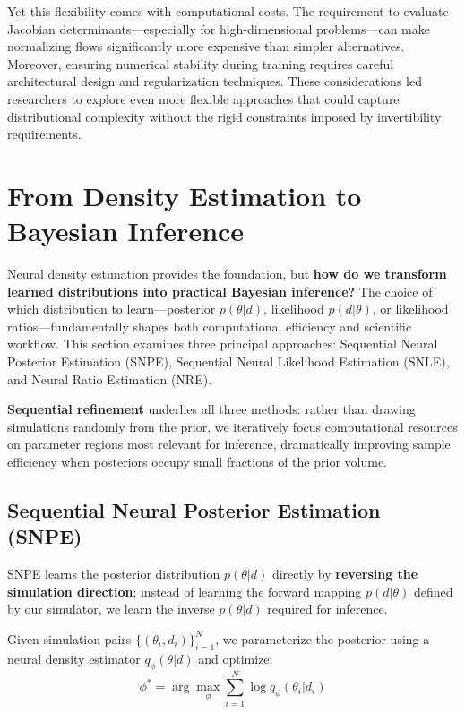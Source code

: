 \documentclass{SciPost}
\begin{document}
Yet this flexibility comes with computational costs. The requirement to evaluate Jacobian determinants—especially for high-dimensional problems—can make normalizing flows significantly more expensive than simpler alternatives. Moreover, ensuring numerical stability during training requires careful architectural design and regularization techniques. These considerations led researchers to explore even more flexible approaches that could capture distributional complexity without the rigid constraints imposed by invertibility requirements.


\section{From Density Estimation to Bayesian Inference}

Neural density estimation provides the foundation, but \textbf{how do we transform learned distributions into practical Bayesian inference?} The choice of which distribution to learn—posterior $p(\theta|d)$, likelihood $p(d|\theta)$, or likelihood ratios—fundamentally shapes both computational efficiency and scientific workflow. This section examines three principal approaches: Sequential Neural Posterior Estimation (SNPE), Sequential Neural Likelihood Estimation (SNLE), and Neural Ratio Estimation (NRE).

\textbf{Sequential refinement} underlies all three methods: rather than drawing simulations randomly from the prior, we iteratively focus computational resources on parameter regions most relevant for inference, dramatically improving sample efficiency when posteriors occupy small fractions of the prior volume.

\subsection{Sequential Neural Posterior Estimation (SNPE)}

SNPE learns the posterior distribution $p(\theta|d)$ directly by \textbf{reversing the simulation direction}: instead of learning the forward mapping $p(d|\theta)$ defined by our simulator, we learn the inverse $p(\theta|d)$ required for inference.

Given simulation pairs $\{(\theta_i, d_i)\}_{i=1}^N$, we parameterize the posterior using a neural density estimator $q_\phi(\theta|d)$ and optimize:
\begin{equation}
    \phi^* = \arg\max_\phi \sum_{i=1}^N \log q_\phi(\theta_i | d_i)
\end{equation}
\end{document}

